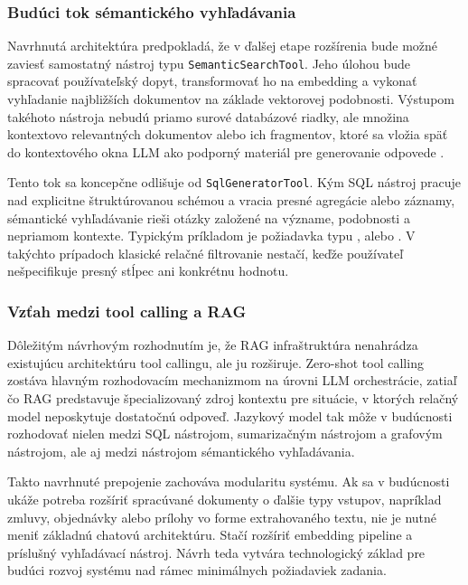 \subsubsection{Budúci tok sémantického vyhľadávania}

Navrhnutá architektúra predpokladá, že v ďalšej etape rozšírenia bude možné zaviesť
samostatný nástroj typu \texttt{SemanticSearchTool}. Jeho úlohou bude spracovať používateľský
dopyt, transformovať ho na embedding a vykonať vyhľadanie najbližších dokumentov
na základe vektorovej podobnosti. Výstupom takéhoto nástroja nebudú priamo surové
databázové riadky, ale množina kontextovo relevantných dokumentov alebo ich
fragmentov, ktoré sa vložia späť do kontextového okna LLM ako podporný materiál pre
generovanie odpovede \cite{zhao2023}.

Tento tok sa koncepčne odlišuje od \texttt{SqlGeneratorTool}. Kým SQL nástroj pracuje
nad explicitne štruktúrovanou schémou a vracia presné agregácie alebo záznamy,
sémantické vyhľadávanie rieši otázky založené na význame, podobnosti a nepriamom kontexte.
Typickým príkladom je požiadavka typu , 
alebo . V takýchto prípadoch
klasické relačné filtrovanie nestačí, keďže používateľ nešpecifikuje presný
stĺpec ani konkrétnu hodnotu.

\subsubsection{Vzťah medzi tool calling a RAG}

Dôležitým návrhovým rozhodnutím je, že RAG infraštruktúra nenahrádza existujúcu
architektúru tool callingu, ale ju rozširuje. Zero-shot tool calling zostáva
hlavným rozhodovacím mechanizmom na úrovni LLM orchestrácie, zatiaľ čo RAG predstavuje
špecializovaný zdroj kontextu pre situácie, v ktorých relačný model neposkytuje
dostatočnú odpoveď. Jazykový model tak môže v budúcnosti rozhodovať nielen medzi SQL
nástrojom, sumarizačným nástrojom a grafovým nástrojom, ale aj medzi nástrojom sémantického
vyhľadávania.

Takto navrhnuté prepojenie zachováva modularitu systému. Ak sa v budúcnosti
ukáže potreba rozšíriť spracúvané dokumenty o ďalšie typy vstupov, napríklad zmluvy,
objednávky alebo prílohy vo forme extrahovaného textu, nie je nutné meniť základnú
chatovú architektúru. Stačí rozšíriť embedding pipeline a príslušný vyhľadávací
nástroj. Návrh teda vytvára technologický základ pre budúci rozvoj systému nad rámec
minimálnych požiadaviek zadania.

